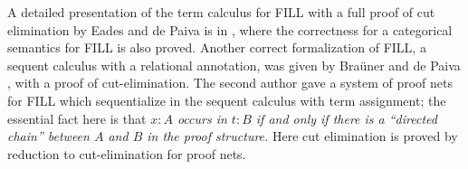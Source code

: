 \documentclass{lmcs}
\makeatletter
\newcommand{\limp}[0]{\multimap}
\def\ScoreOverhang{4pt}			%
\def\ScoreOverhangLeft{\ScoreOverhang}
\def\ScoreOverhangRight{\ScoreOverhang}
\def\extraVskip{2pt}			%
\def\ruleScoreFiller{\hrule}		%
\def\defaultScoreFiller{\ruleScoreFiller}  %
\def\defaultBuildScore{\buildSingleScore}  %
\def\defaultHypSeparation{\hskip.2in}   %
\def\theHypSeparation{\defaultHypSeparation}
\def\alwaysScoreFiller{\defaultScoreFiller}	%
\def\alwaysBuildScore{\defaultBuildScore}
\def\theScoreFiller{\alwaysScoreFiller}	%
\def\buildScore{\alwaysBuildScore}   %
\def\hypKernAmt{0pt}	%
\def\defaultLeftLabel{}
\def\defaultRightLabel{}
\def\myTrue{Y}
\def\bottomAlignFlag{N}
\def\centerAlignFlag{N}
\def\newdimen{\alloc@1\dimen\dimendef\insc@unt}
\def\newbox{\alloc@4\box\chardef\insc@unt}
\def\thecur#1{\csname#1\number\theLevel\endcsname}
\def\allocatemore{%
	\ifnum\theLevel>\myMaxLevel%
		\expandafter\newbox\curBox%
		\expandafter\newdimen\curScoreStart%
		\expandafter\newdimen\curCenter%
		\expandafter\newdimen\curScoreEnd%
		\global\advance\myMaxLevel by1%
	\fi%
}
\def\prepAxiom{%
	\advance\theLevel by1%
	\edef\curBox{\thecur{myBox}}%
	\edef\curScoreStart{\thecur{myScoreStart}}%
	\edef\curCenter{\thecur{myCenter}}%
	\edef\curScoreEnd{\thecur{myScoreEnd}}%
	\allocatemore%
}
\def\AxiomC#1{		%
	\prepAxiom%
	\setbox\myBoxA=\hbox{#1}%
	\global\setbox\curBox =%
		\hbox{\hskip\ScoreOverhangLeft\relax%
                        \unhcopy\myBoxA\hskip\ScoreOverhangRight\relax}%
        \global\curScoreStart=0pt \relax
        \global\curScoreEnd=\wd\curBox \relax
        \global\curCenter=.5\wd\curBox \relax
        \global\advance \curCenter by \ScoreOverhangLeft%
	\ignorespaces
}
\def\prepUnary{%
	\ifnum \theLevel<1 
		\errmessage{Hypotheses missing!}
	\fi%
	\edef\curBox{\thecur{myBox}}%
	\edef\curScoreStart{\thecur{myScoreStart}}%
	\edef\curCenter{\thecur{myCenter}}%
	\edef\curScoreEnd{\thecur{myScoreEnd}}%
}
\def\UnaryInfC#1{
	\prepUnary%
	\buildConclusionC{#1}%
	\joinUnary%
	\resetInferenceDefaults%
	\ignorespaces%
}
\def\buildConclusionC#1{%
	\setbox\myBoxA=\hbox{#1}%
	\setbox\myBoxC =%
		\hbox{\hbox{\hskip\ScoreOverhangLeft\relax%
                        \unhcopy\myBoxA\hskip\ScoreOverhangRight\relax}}%
	\newScoreStart=0pt \relax%
	\newCenter=.5\wd\myBoxC \relax%
	\newScoreEnd=\wd\myBoxC%
        \advance \newCenter by \ScoreOverhangLeft%
}
\def\joinUnary{%
	\global\advance\curCenter by -\hypKernAmt%
	\ifnum\curCenter<\newCenter%
		\displace=\newCenter%
		\advance \displace by -\curCenter%
		\kernUpperBox%
	\else%
		\displace=\curCenter%
		\advance \displace by -\newCenter%
		\kernLowerBox%
	\fi%
        \ifnum \newScoreStart < \curScoreStart %
		\global \curScoreStart = \newScoreStart \fi%
	\ifnum \curScoreEnd < \newScoreEnd %
		\global \curScoreEnd = \newScoreEnd \fi%
	\ifnum \curScoreStart<\wd\myBoxLL%
		\global\displace = \wd\myBoxLL%
		\global\advance\displace by -\curScoreStart%
		\kernUpperBox%
		\kernLowerBox%
	\fi%
	\buildScore%
	\buildScoreLabels%
	\global \setbox \curBox =%
		\vbox{\box\curBox%
			\vskip\thisAboveSkip \relax%
			\nointerlineskip\box\myBoxD%
			\vskip\thisBelowSkip \relax%
			\nointerlineskip\box\myBoxC}%
	\global \curScoreStart=\newScoreStart%
	\global \curScoreEnd=\newScoreEnd%
	\global \curCenter=\newCenter%
}
\def\kernUpperBox{%
		\global\setbox\curBox =%
			\hbox{\hskip\displace\box\curBox}%
		\global\advance \curScoreStart by \displace%
		\global\advance \curScoreEnd by \displace%
		\global\advance\curCenter by \displace%
}
\def\kernLowerBox{%
		\global\setbox\myBoxC =%
			\hbox{\hskip\displace\unhbox\myBoxC}%
		\global\advance \newScoreStart by \displace%
		\global\advance \newScoreEnd by \displace%
		\global\advance\newCenter by \displace%
}
\def\DisplayProof{%
	\ifnum \theLevel=1 \relax \else%
		\errmessage{Proof tree badly specified.}%
	\fi%
	\edef\curBox{\thecur{myBox}}%
	\ifx\bottomAlignFlag\myTrue%
		\displace=0pt%
	\else%
		\displace=.5\ht\curBox%
		\ifx\centerAlignFlag\myTrue\relax
		\else%
		      	\advance\displace by -3pt%
		\fi%
	\fi%
	\leavevmode%
	\lower\displace\hbox{\copy\curBox}%
	\global\theLevel=0%
	\global\def\alwaysBuildScore{\defaultBuildScore}%
	\global\def\alwaysScoreFiller{\defaultScoreFiller}%
	\def\bottomAlignFlag{N}
	\def\centerAlignFlag{N}
	\resetInferenceDefaults%
	\ignorespaces
}
\def\buildSingleScore{%
	\displace=\curScoreEnd%
	\advance \displace by -\curScoreStart%
	\global\setbox \myBoxD =%
		\hbox to \displace{\expandafter\xleaders\theScoreFiller\hfill}%
}
\def\singleLine{%
	\gdef\buildScore{\buildSingleScore}%
	\ignorespaces
}
\def\insertBetweenHyps#1{%
	\gdef\theHypSeparation{#1}%
	\ignorespaces
}
\def\buildScoreLabels{%
	\scoreHeight = \ht\myBoxD%
	\scoreDepth = \dp\myBoxD%
	\leftLowerAmt=\ht\myBoxLL%
	\advance \leftLowerAmt by -\dp\myBoxLL%
	\advance \leftLowerAmt by -\scoreHeight%
	\advance \leftLowerAmt by \scoreDepth%
	\leftLowerAmt=.5\leftLowerAmt%
	\rightLowerAmt=\ht\myBoxRL%
	\advance \rightLowerAmt by -\dp\myBoxRL%
	\advance \rightLowerAmt by -\scoreHeight%
	\advance \rightLowerAmt by \scoreDepth%
	\rightLowerAmt=.5\rightLowerAmt%
	\displace = \curScoreStart%
	\advance\displace by -\wd\myBoxLL%
	\global\setbox\myBoxD =%
		\hbox{\hskip\displace%
			\lower\leftLowerAmt\copy\myBoxLL%
			\box\myBoxD%
			\lower\rightLowerAmt\copy\myBoxRL}%
	\global\thisAboveSkip = \ht\myBoxLL%
	\global\advance \thisAboveSkip by -\leftLowerAmt%
	\global\advance \thisAboveSkip by -\scoreHeight%
	\ifnum \thisAboveSkip<0 %
		\global\thisAboveSkip=0pt%
	\fi%
	\displace = \ht\myBoxRL%
	\advance \displace by -\rightLowerAmt%
	\advance \displace by -\scoreHeight%
	\ifnum \displace<0 %
		\displace=0pt%
	\fi%
	\ifnum \displace>\thisAboveSkip %
		\global\thisAboveSkip=\displace%
	\fi%
	\global\thisBelowSkip = \dp\myBoxLL%
	\global\advance\thisBelowSkip by \leftLowerAmt%
	\global\advance\thisBelowSkip by -\scoreDepth%
	\ifnum\thisBelowSkip<0 %
		\global\thisBelowSkip = 0pt%
	\fi%
	\displace = \dp\myBoxLL%
	\advance\displace by \rightLowerAmt%
	\advance\displace by -\scoreDepth%
	\ifnum\displace<0 %
		\displace = 0pt%
	\fi%
	\ifnum\displace>\thisBelowSkip%
		\global\thisBelowSkip = \displace%
	\fi
	\global\thisAboveSkip = -\thisAboveSkip%
	\global\thisBelowSkip = -\thisBelowSkip%
	\global\advance\thisAboveSkip by\extraVskip%
	\global\advance\thisBelowSkip by\extraVskip%
}
\def\resetInferenceDefaults{%
	\global\def\theHypSeparation{\defaultHypSeparation}%
	\global\setbox\myBoxLL=\hbox{\defaultLeftLabel}%
	\global\setbox\myBoxRL=\hbox{\defaultRightLabel}%
	\global\def\buildScore{\alwaysBuildScore}%
	\global\def\theScoreFiller{\alwaysScoreFiller}%
	\gdef\hypKernAmt{0pt}%
}
\def\limp{\mathrel{-\!\circ}}
\makeatother
\begin{document}

A detailed presentation of the term calculus for FILL with a full
proof of cut elimination by Eades and de Paiva is in
\cite{EadesP:2016}, where the correctness for a categorical semantics
for FILL is also proved.  Another correct formalization of FILL, a
sequent calculus with a relational annotation, was given by Bra\"uner
and de Paiva \cite{BraunerDePaiva:1997}, with a proof of
cut-elimination.  The second author \cite{Bellin:1997} gave a system
of proof nets for FILL which sequentialize in the sequent calculus
with term assignment; the essential fact here is that \emph{$x:A$
  occurs in $t:B$ if and only if there is a ``directed chain'' between
  $A$ and $B$ in the proof structure.}  Here cut elimination is proved
by reduction to cut-elimination for proof nets.
\end{document}

